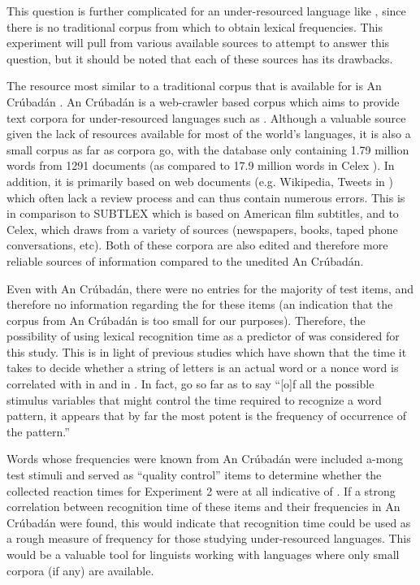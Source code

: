 \documentclass[output=paper
,newtxmath
,modfonts
,nonflat]{langsci/langscibook}
\begin{document}
This question is further complicated for an under-resourced language like , since there is no traditional corpus from which to obtain lexical frequencies. This experiment will pull from various available sources to attempt to answer this question, but it should be noted that each of these sources has its drawbacks. 

The resource most similar to a traditional corpus that is available for  is An Crúbadán \citep{scannell2007crubadan}. An Crúbadán is a web-crawler based corpus which aims to provide text corpora for under-resourced languages such as . Although a valuable source given the lack of resources available for most of the world’s languages, it is also a small corpus as far as corpora go, with the  database only containing 1.79 million words from 1291 documents (as compared to 17.9 million words in Celex \citep{BaayenEtAl1993}). In addition, it is primarily based on web documents (e.g.  Wikipedia, Tweets in ) which often lack a review process and can thus contain numerous errors. This is in comparison to SUBTLEX which is based on American film subtitles, and to Celex, which draws from a variety of sources (newspapers, books, taped phone conversations, etc). Both of these corpora are also edited and therefore more reliable sources of information compared to the unedited An Crúbadán.

Even with An Crúbadán, there were no entries for the majority of test items, and therefore no information regarding the  for these items (an indication that the  corpus from An Crúbadán is too small for our purposes). Therefore, the possibility of using lexical recognition time as a predictor of  was considered for this study. This is in light of previous studies which have shown that the time it takes to decide whether a string of letters is an actual word or a nonce word is correlated with  in  \citep{brysbaert2011word} and in  \citep{baayen2006morphological}. In fact,  \citet{murray2004serial} go so far as to say “[o]f all the possible stimulus variables that might control the time required to recognize a word pattern, it appears that by far the most potent is the frequency of occurrence of the pattern.” 

Words whose frequencies were known from An Crúbadán were included a-mong test stimuli and served as “quality control” items to determine whether the collected reaction times for Experiment 2 were at all indicative of . If a strong correlation between recognition time of these items and their frequencies in An Crúbadán were found, this would indicate that recognition time could be used as a rough measure of frequency for those studying under-resourced languages. This would be a valuable tool for linguists working with languages where only small corpora (if any) are available.
\end{document}
